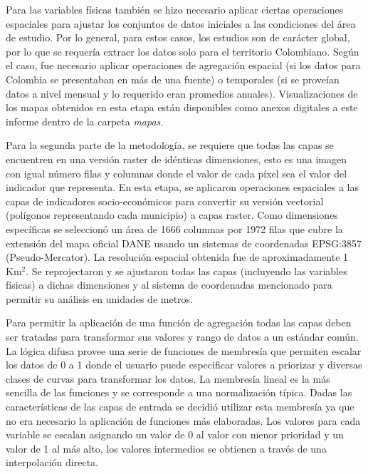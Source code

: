 Para las variables físicas también se hizo necesario aplicar ciertas operaciones espaciales para ajustar los conjuntos de datos iniciales a las condiciones del 
área de estudio.  Por lo general, para estos casos, los estudios son de carácter global, por lo que se requería extraer los datos solo para el territorio 
Colombiano.  Según el caso, fue necesario aplicar operaciones de agregación espacial (si los datos para Colombia se presentaban en más de una fuente) o
temporales (si se proveían datos a nivel mensual y lo requerido eran promedios anuales).  Visualizaciones de los mapas obtenidos en esta etapa están
disponibles como anexos digitales a este informe dentro de la carpeta \textit{mapas}.

Para la segunda parte de la metodología, se requiere que todas las capas se encuentren en una versión raster de idénticas dimensiones, esto es
una imagen con igual número filas y columnas donde el valor de cada píxel sea el valor del indicador que representa.  En esta etapa, se aplicaron operaciones
espaciales a las capas de indicadores socio-económicos para convertir su versión vectorial (polígonos representando cada municipio) a capas raster.  Como 
dimensiones específicas se seleccionó un área de 1666 columnas por 1972 filas que cubre la extensión del mapa oficial DANE usando un sistemas de coordenadas 
EPSG:3857 (Pseudo-Mercator).  La resolución espacial obtenida fue de aproximadamente 1 Km$^2$.  Se reprojectaron y se ajustaron todas las capas (incluyendo las 
variables físicas) a dichas dimensiones y al sistema de coordenadas mencionado para permitir su análisis en unidades de metros.

Para permitir la aplicación de una función de agregación todas las capas deben ser tratadas para transformar sus valores y rango de datos a un estándar común.  
La lógica difusa provee una serie de funciones de membresía que permiten escalar los datos de 0 a 1 donde el usuario puede especificar valores a priorizar y 
diversas clases de curvas para transformar los datos.  La membresía lineal es la más sencilla de las funciones y se corresponde a una normalización típica.  
Dadas las características de las capas de entrada se decidió utilizar esta membresía ya que no era necesario la aplicación de funciones más elaboradas. 
Los valores para cada variable se escalan asignando un valor de 0 al valor con menor prioridad y un valor de 1 al más alto, los valores intermedios se obtienen 
a través de una interpolación directa.

